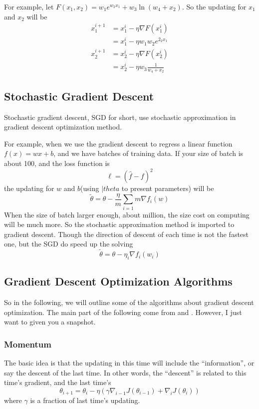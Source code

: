 \documentclass{article}
\begin{document}
For example, let $F(x_1,x_2)=w_1e^{w_2x_1}+w_3\ln(w_4+x_2)$. So the updating for $x_1$ and $ x_2$ will be 
\begin{align*}
x_1^{i+1} &= x_1^i - \eta\nabla F(x_1^i) \\ &= x_1^i - \eta w_1w_2e^{2_2x_1} \\
x_2^{i+1} &= x_2^i - \eta\nabla F(x_2^i) \\ &= x_2^i -\eta w_3\frac{1}{w_4+x_2}
\end{align*}

\subsection{Stochastic Gradient Descent}
\label{aec:gd:sgd}

Stochastic gradient descent, SGD for short, use stochastic approximation in gradient descent optimization method.

For example, when we use the gradient descent to regress a linear function $f(x) = wx+b$, and we have batches of training data.
If your size of batch is about 100, and the loss function is
\[
\ell = (\hat{f} - f)^2
\]
the updating for $w$ and $b$(using $|theta$ to present parameters) will be
\[
\tilde{\theta} = \theta - \frac{\eta}{m}\sum\limits_{i=1}{m}\nabla f_i(w)
\]
When the size of batch larger enough, about million, the size cost on computing will be much more.
So the stochastic approximation method is imported to gradient descent. Though the direction of descent of each time is not
the fastest one, but the SGD do speed up the solving
\[
\tilde{\theta} = \theta - \eta _i\nabla f_i(w_i)
\]

\subsection{Gradient Descent Optimization Algorithms}
\label{sec:gd:gdoa}

So in the following, we will outline some of the algorithms about gradient descent optimization. The main part of the following come from
\cite{DBLP:journals/corr/Ruder16} and \cite{wikipedia:sgd}. However, I just want to given you a snapshot.

\subsubsection{Momentum}
\label{sec:gd:gdoa:momentum}

The basic idea is that the updating in this time will include the ``information'', or say the descent of the last time.
In other words, the ``descent'' is related to this time's gradient, and the last time's
\[
\theta_{i+1} = \theta_i - \eta\left(\gamma\nabla_{i-1}J(\theta_{i-1}) + \nabla_iJ(\theta_i)\right)
\]
where $\gamma$ is a fraction of last time's updating.
\end{document}
